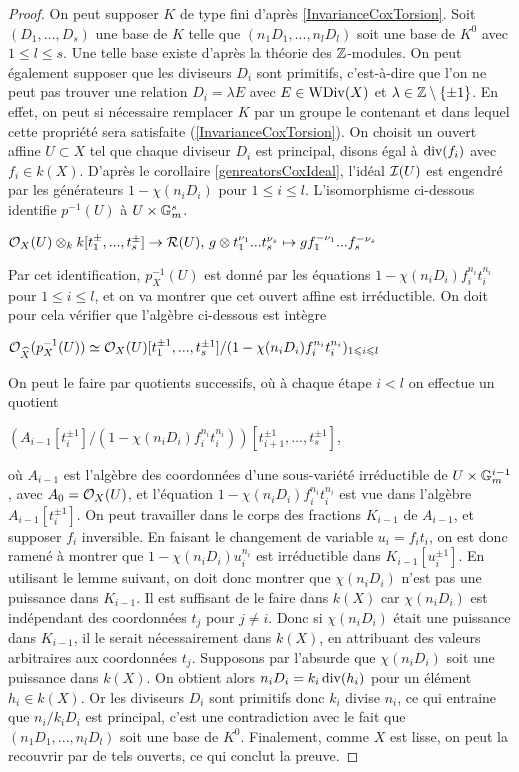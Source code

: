 \begin{proof}
On peut supposer $K$ de type fini d'après \ref{InvarianceCoxTorsion}. Soit $(D_1,...,D_s)$ une base de $K$ telle que $(n_1D_1,...,n_lD_l)$ soit une base de $K^0$ avec $1\leq l\leq s$. Une telle base existe d'après la théorie des $\mathbb{Z}$-modules. On peut également supposer que les diviseurs $D_i$ sont primitifs, c'est-à-dire que l'on ne peut pas trouver une relation $D_i=\lambda E$ avec $E\in\operatorname{WDiv}(X)$ et $\lambda\in \mathbb{Z}\setminus\lbrace \pm 1\rbrace$. En effet, on peut si nécessaire remplacer $K$ par un groupe le contenant et dans lequel cette propriété sera satisfaite (\ref{InvarianceCoxTorsion}). On choisit un ouvert affine $U\subset X$ tel que chaque diviseur $D_i$ est principal, disons égal à $\operatorname{div}(f_i)$ avec $f_i\in k(X)$. D'après le corollaire \ref{genreatorsCoxIdeal}, l'idéal $\mathcal{I}(U)$ est engendré par les générateurs $1-\chi(n_iD_i)$ pour $1\leq i\leq l$. L'isomorphisme ci-dessous identifie $p^{-1}(U)$ à $U\times \mathbb{G}_m^s$. 
\begin{center}
$\mathcal{O}_X(U)\otimes_k k[t_1^{\pm},...,t_s^{\pm}] \rightarrow \mathcal{R}(U),\, g\otimes t_1^{\nu_1}...t_s^{\nu_s}\mapsto gf_1^{-\nu_1}...f_s^{-\nu_s}$
\end{center}
Par cet identification, $p_X^{-1}(U)$ est donné par les équations $1-\chi(n_iD_i)f_i^{n_i}t_i^{n_i}$ pour $1\leq i\leq l$, et on va montrer que cet ouvert affine est irréductible. On doit pour cela vérifier que l'algèbre ci-dessous est intègre
\begin{center}
$\mathcal{O}_{\widehat{X}}(p_X^{-1}(U))\simeq \mathcal{O}_X(U)[t_1^{\pm 1},...,t_s^{\pm 1}]/(1-\chi(n_iD_i)f_i^{n_i}t_i^{n_i})_{1\leqslant i\leqslant l}$
\end{center}
On peut le faire par quotients successifs, où à chaque étape $i<l$ on effectue un quotient
\begin{center}
$(A_{i-1}[t_i^{\pm 1}]/(1-\chi(n_iD_i)f_i^{n_i}t_i^{n_i}))[t_{i+1}^{\pm 1},...,t_s^{\pm 1}]$,
\end{center}
où $A_{i-1}$ est l'algèbre des coordonnées d'une sous-variété irréductible de $U\times\mathbb{G}_m^{i-1}$, avec $A_0=\mathcal{O}_X(U)$, et l'équation $1-\chi(n_iD_i)f_i^{n_i}t_i^{n_i}$ est vue dans l'algèbre $A_{i-1}[t_i^{\pm 1}]$. On peut travailler dans le corps des fractions $K_{i-1}$ de $A_{i-1}$, et supposer $f_i$ inversible. En faisant le changement de variable $u_i=f_it_i$, on est donc ramené à montrer que $1-\chi(n_iD_i)u_i^{n_i}$ est irréductible dans $K_{i-1}[u_i^{\pm 1}]$. En utilisant le lemme suivant, on doit donc montrer que $\chi(n_iD_i)$ n'est pas une puissance dans $K_{i-1}$. Il est suffisant de le faire dans $k(X)$ car $\chi(n_iD_i)$ est indépendant des coordonnées $t_j$ pour $j\neq i$. Donc si $\chi(n_iD_i)$ était une puissance dans $K_{i-1}$, il le serait nécessairement dans $k(X)$, en attribuant des valeurs arbitraires aux coordonnées $t_j$. Supposons par l'absurde que $\chi(n_iD_i)$ soit une puissance dans $k(X)$. On obtient alors $n_iD_i=k_i\operatorname{div}(h_i)$ pour un élément $h_i\in k(X)$. Or les diviseurs $D_i$ sont primitifs donc $k_i$ divise $n_i$, ce qui entraine que $n_i/k_iD_i$ est principal, c'est une contradiction avec le fait que $(n_1D_1,...,n_lD_l)$ soit une base de $K^0$. Finalement, comme $X$ est lisse, on peut la recouvrir par de tels ouverts, ce qui conclut la preuve.
\end{proof}

